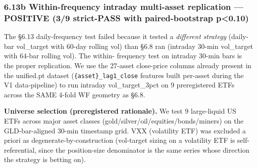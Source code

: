 \documentclass[
]{article}
\begin{document}
\subsubsection{6.13b Within-frequency intraday multi-asset replication
--- POSITIVE (3/9 strict-PASS with paired-bootstrap
p\textless0.10)}\label{b-within-frequency-intraday-multi-asset-replication-positive-39-strict-pass-with-paired-bootstrap-p0.10}

The §6.13 daily-frequency test failed because it tested a
\emph{different strategy} (daily-bar vol\_target with 60-day rolling
vol) than §6.8 ran (intraday 30-min vol\_target with 64-bar rolling
vol). The within- frequency test on intraday 30-min bars is the proper
replication. We use the 27-asset close-price columns already present in
the unified.pt dataset (\texttt{\{asset\}\_lag1\_close} features built
per-asset during the V1 data-pipeline) to run intraday vol\_target\_3pct
on 9 preregistered ETFs across the SAME 4-fold WF geometry as §6.8.

\textbf{Universe selection (preregistered rationale).} We test 9
large-liquid US ETFs across major asset classes
(gold/silver/oil/equities/bonds/miners) on the GLD-bar-aligned 30-min
timestamp grid. VXX (volatility ETF) was excluded a priori as
degenerate-by-construction (vol-target sizing on a volatility ETF is
self-referential, since the position-size denominator is the same series
whose direction the strategy is betting on).
\end{document}
